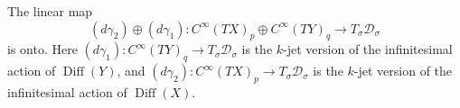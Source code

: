 The linear map
\[
(d\gamma_{2}) \oplus (d\gamma_{1}) : C^{\infty}(TX)_{p} \oplus C^{\infty}(TY)_{q} \to T_{\sigma}\mathcal{D}_{\sigma}
\]
is onto. Here $(d\gamma_{1}): C^{\infty}(TY)_{q} \to T_{\sigma}\mathcal{D}_{\sigma}$ is the $k$-jet version of the infinitesimal action of $\operatorname{Diff}(Y)$, and $(d\gamma_{2}): C^{\infty}(TX)_{p} \to T_{\sigma}\mathcal{D}_{\sigma}$ is the $k$-jet version of the infinitesimal action of $\operatorname{Diff}(X)$.
